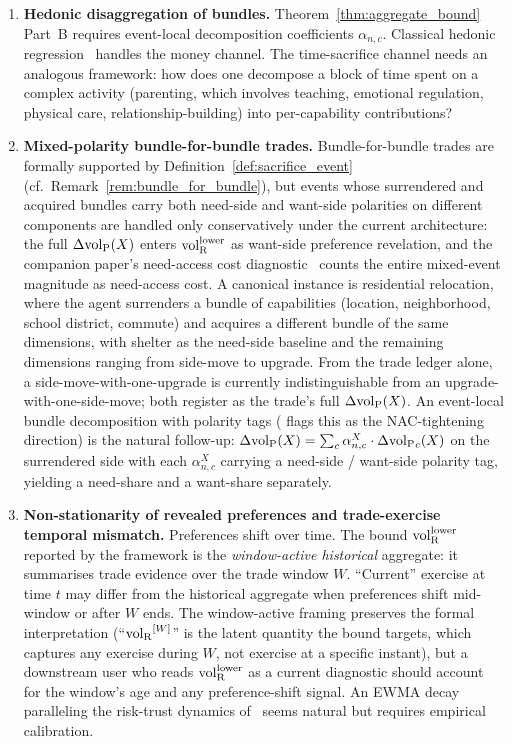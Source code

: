 \begin{enumerate}

\item \label{oq:hedonic}
\textbf{Hedonic disaggregation of bundles.}
Theorem~\ref{thm:aggregate_bound} Part~B requires event-local
decomposition coefficients $\alpha_{n,c}$.  Classical hedonic
regression~\citep{rosen1974hedonic} handles the money channel.
The time-sacrifice channel needs an analogous framework: how
does one decompose a block of time spent on a complex activity
(parenting, which involves teaching, emotional regulation,
physical care, relationship-building) into per-capability
contributions?

\item \label{oq:mixed_polarity}
\textbf{Mixed-polarity bundle-for-bundle trades.}
Bundle-for-bundle trades are formally supported by
Definition~\ref{def:sacrifice_event} (cf.\
Remark~\ref{rem:bundle_for_bundle}), but events whose
surrendered and acquired bundles carry both need-side and
want-side polarities on different components are handled only
conservatively under the current architecture: the full
$\Delta{\operatorname{vol}_{\mathrm{P}}}(X)$ enters ${\operatorname{vol}_{\mathrm{R}}^{\mathrm{lower}}}$ as want-side preference
revelation, and the companion paper's need-access cost
diagnostic~\citep[Need~Sufficiency]{lasser2026paper8b}
counts the entire mixed-event magnitude as need-access cost.
A canonical instance is residential relocation, where the
agent surrenders a bundle of capabilities (location,
neighborhood, school district, commute) and acquires a
different bundle of the same dimensions, with shelter as the
need-side baseline and the remaining dimensions ranging from
side-move to upgrade.  From the trade ledger alone, a
side-move-with-one-upgrade is currently indistinguishable
from an upgrade-with-one-side-move; both register as the
trade's full $\Delta{\operatorname{vol}_{\mathrm{P}}}(X)$.  An event-local bundle
decomposition with polarity tags
(\citep[Need~Sufficiency]{lasser2026paper8b} flags this as the
NAC-tightening direction) is the natural follow-up:
$\Delta{\operatorname{vol}_{\mathrm{P}}}(X) = \sum_c \alpha^{X}_{n,c} \cdot
\Delta{\operatorname{vol}_{\mathrm{P}}}_c(X)$ on the surrendered side with each
$\alpha^{X}_{n,c}$ carrying a need-side / want-side polarity
tag, yielding a need-share and a want-share separately.

\item \label{oq:nonstationarity}
\textbf{Non-stationarity of revealed preferences and trade-exercise
temporal mismatch.}
Preferences shift over time.  The bound
${\operatorname{vol}_{\mathrm{R}}^{\mathrm{lower}}}$ reported by the framework is the
\emph{window-active historical} aggregate: it summarises trade
evidence over the trade window $W$.  ``Current'' exercise at
time $t$ may differ from the historical aggregate when
preferences shift mid-window or after $W$ ends.  The
window-active framing preserves the formal interpretation
(``${\operatorname{vol}_{\mathrm{R}}}^{[W]}$'' is the latent quantity the bound targets,
which captures any exercise during $W$, not exercise at a
specific instant), but a downstream user who reads
${\operatorname{vol}_{\mathrm{R}}^{\mathrm{lower}}}$ as a current diagnostic should account for the
window's age and any preference-shift signal.  An EWMA decay
paralleling the risk-trust dynamics
of~\citep[Definition~4]{lasser2026scm} seems natural but
requires empirical calibration.


\end{enumerate}
